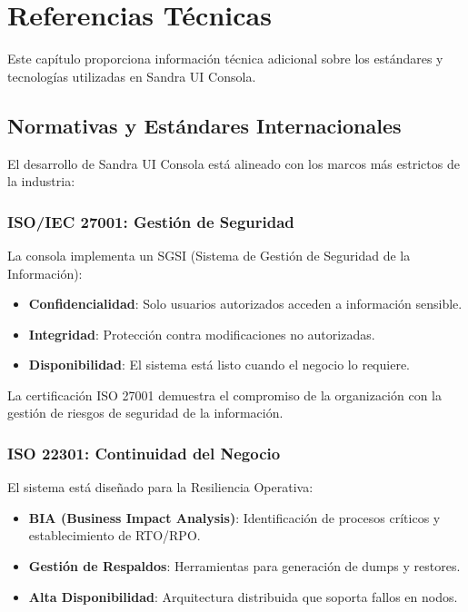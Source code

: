
\chapter{Referencias Técnicas}

Este capítulo proporciona información técnica adicional sobre los estándares y tecnologías utilizadas en Sandra UI Consola.

\section{Normativas y Estándares Internacionales}

El desarrollo de Sandra UI Consola está alineado con los marcos más estrictos de la industria:

\subsection{ISO/IEC 27001: Gestión de Seguridad}

La consola implementa un SGSI (Sistema de Gestión de Seguridad de la Información):

\begin{itemize}
\item \textbf{Confidencialidad}: Solo usuarios autorizados acceden a información sensible.
\item \textbf{Integridad}: Protección contra modificaciones no autorizadas.
\item \textbf{Disponibilidad}: El sistema está listo cuando el negocio lo requiere.
\end{itemize}

La certificación ISO 27001 demuestra el compromiso de la organización con la gestión de riesgos de seguridad de la información.

\subsection{ISO 22301: Continuidad del Negocio}

El sistema está diseñado para la Resiliencia Operativa:

\begin{itemize}
\item \textbf{BIA (Business Impact Analysis)}: Identificación de procesos críticos y establecimiento de RTO/RPO.
\item \textbf{Gestión de Respaldos}: Herramientas para generación de dumps y restores.
\item \textbf{Alta Disponibilidad}: Arquitectura distribuida que soporta fallos en nodos.
\end{itemize}

